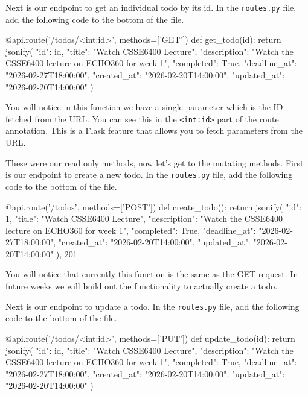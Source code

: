 \documentclass{csse4400}
\begin{document}
Next is our endpoint to get an individual todo by its id.
In the \texttt{routes.py} file, add the following code to the bottom of the file.

\begin{code}[language=python]{}
  @api.route('/todos/<int:id>', methods=['GET'])
  def get_todo(id):
      return jsonify({
        "id": id,
        "title": "Watch CSSE6400 Lecture",
        "description": "Watch the CSSE6400 lecture on ECHO360 for week 1",
        "completed": True,
        "deadline_at": "2026-02-27T18:00:00",
        "created_at": "2026-02-20T14:00:00",
        "updated_at": "2026-02-20T14:00:00"
      })
\end{code}

You will notice in this function we have a single parameter which is the ID fetched from the URL.
You can see this in the \texttt{<int:id>} part of the route annotation.
This is a Flask feature that allows you to fetch parameters from the URL. 

These were our read only methods, now let's get to the mutating methods.
First is our endpoint to create a new todo.
In the \texttt{routes.py} file, add the following code to the bottom of the file.

\begin{code}[language=python]{}
  @api.route('/todos', methods=['POST'])
  def create_todo():
      return jsonify({
        "id": 1,
        "title": "Watch CSSE6400 Lecture",
        "description": "Watch the CSSE6400 lecture on ECHO360 for week 1",
        "completed": True,
        "deadline_at": "2026-02-27T18:00:00",
        "created_at": "2026-02-20T14:00:00",
        "updated_at": "2026-02-20T14:00:00"
      }), 201
\end{code}

You will notice that currently this function is the same as the GET request.
In future weeks we will build out the functionality to actually create a todo.

Next is our endpoint to update a todo.
In the \texttt{routes.py} file, add the following code to the bottom of the file.

\begin{code}[language=python]{}
  @api.route('/todos/<int:id>', methods=['PUT'])
  def update_todo(id):
      return jsonify({
        "id": id,
        "title": "Watch CSSE6400 Lecture",
        "description": "Watch the CSSE6400 lecture on ECHO360 for week 1",
        "completed": True,
        "deadline_at": "2026-02-27T18:00:00",
        "created_at": "2026-02-20T14:00:00",
        "updated_at": "2026-02-20T14:00:00"
      })
\end{code}
\end{document}
